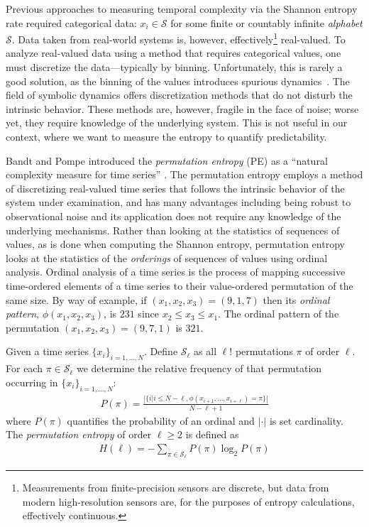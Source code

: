 Previous approaches to measuring temporal complexity via the Shannon
entropy rate \cite{Shannon1951, mantegna1994linguistic} required
categorical data: $x_i \in \mathcal{S}$ for some finite or countably
infinite \emph{alphabet} $\mathcal{S}$.  Data taken from real-world
systems is, however, effectively\footnote{Measurements from
  finite-precision sensors are discrete, but data from modern
  high-resolution sensors are, for the purposes of entropy
  calculations, effectively continuous.}  real-valued.  To analyze
real-valued data using a method that requires categorical values, one
must discretize the data---typically by binning.  Unfortunately, this
is rarely a good solution, as the binning of the values introduces
spurious dynamics~\cite{bollt2001}.  The field of symbolic dynamics
offers discretization methods that do not disturb the intrinsic
behavior.  These methods are, however, fragile in the face of noise;
worse yet, they require knowledge of the underlying system.  This is
not useful in our context, where we want to measure the entropy to
quantify predictability.

Bandt and Pompe introduced the \emph{permutation entropy} (PE) as a
``natural complexity measure for time series''
\cite{bandt2002per}. The permutation entropy employs a method of
discretizing real-valued time series that follows the intrinsic
behavior of the system under examination, and has many advantages 
including being robust to observational noise and its application does 
not require any knowledge of the underlying mechanisms.  Rather than 
looking at the statistics of sequences of values, as is done when 
computing the Shannon entropy, permutation entropy looks at the 
statistics of the \emph{orderings} of sequences of values using 
ordinal analysis. Ordinal analysis of a time series is the process of 
mapping successive time-ordered elements of a time series to their
value-ordered permutation of the same size.  By way of example, if
$(x_1, x_2, x_3) = (9, 1, 7)$ then its \emph{ordinal pattern},
$\phi(x_1, x_2, x_3)$, is $231$ since $x_2 \leq x_3 \leq x_1$.  The
ordinal pattern of the permutation $(x_1, x_2, x_3) = (9, 7, 1)$ is
$321$.

\begin{mydef}

  Given a time series $\{x_i\}_{i = 1,\dots,N}$. Define $\mathcal{S}_\ell$ as all $\ell!$ permutations $\pi$ of order $\ell$. For each $\pi \in \mathcal{S}_\ell$ we determine the relative frequency of that permutation occurring in $\{x_i\}_{i = 1,\dots,N}$:
  \begin{align*}
    P(\pi) = \frac{\left|\{i|i \leq N-\ell,\phi(x_{i+1},\dots,x_{i+\ell}) = \pi\}\right|}{N-\ell+1}
  \end{align*}
  where $P(\pi)$ quantifies the probability of an ordinal and
  $|\cdot|$ is set cardinality. The \emph{permutation entropy} of
  order $\ell \ge 2$ is defined as
  \begin{align*}
    H(\ell) = - \sum_{\pi \in \mathcal{S}_\ell} P(\pi) \log_2 P(\pi)
  \end{align*}

\end{mydef}

